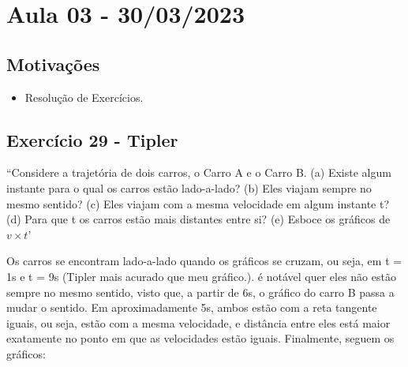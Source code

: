 \documentclass[physics_notes.tex]{subfiles}
\begin{document}
\section{ Aula 03 - 30/03/2023}
\subsection{Motivações}
\begin{itemize}
	\item Resolução de Exercícios.
\end{itemize}
\subsection{Exercício 29 - Tipler}
``Considere a trajetória de dois carros, o Carro A e o Carro B. (a) Existe algum instante para o qual os carros estão lado-a-lado? (b) Eles viajam sempre no mesmo sentido? (c) Eles viajam com a mesma velocidade em algum instante t? (d) Para que t os carros estão mais distantes entre si? (e) Esboce os gráficos de $v\times t$'
\begin{center}
\end{center}
Os carros se encontram lado-a-lado quando os gráficos se cruzam, ou seja, em t = 1s e t = 9s (Tipler mais acurado que meu gráfico.). é notável
quer eles não estão sempre no mesmo sentido, visto que, a partir de 6s, o gráfico do carro B passa a mudar o sentido. Em aproximadamente 5s,
ambos estão com a reta tangente iguais, ou seja, estão com a mesma velocidade, e distância entre eles está maior exatamente no ponto em que as
velocidades estão iguais. Finalmente, seguem os gráficos:
\begin{center}
\end{center}
\end{document}
